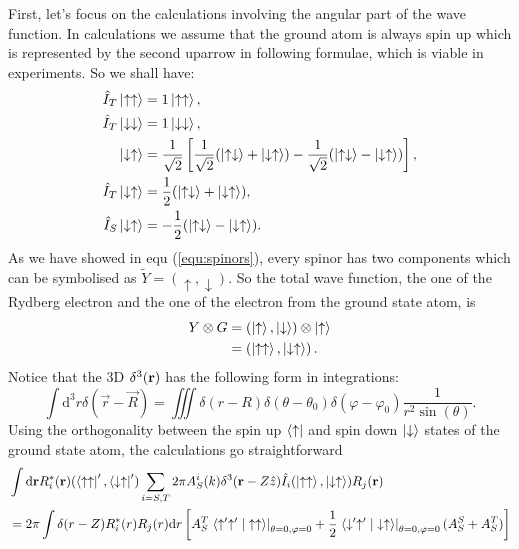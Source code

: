\documentclass[british,english]{article}
\numberwithin{equation}{section}
\numberwithin{figure}{section}
\begin{document}
First, let's focus on the calculations involving the angular part of the wave function. In calculations we assume that the ground atom is always spin up which is represented by the second uparrow in following formulae, which is viable in experiments. So we shall have:
\begin{equation}
	\begin{aligned}
	\hat I_T\ket{\uparrow\uparrow}&=1\ket{\uparrow\uparrow},\\
	\hat I_T\ket{\downarrow\downarrow}&=1\ket{\downarrow\downarrow},\\
	\ket{\downarrow\uparrow}&=\frac{1}{\sqrt{2}}\left[\frac{1}{\sqrt{2}}(\ket{\uparrow\downarrow}+\ket{\downarrow\uparrow})-\frac{1}{\sqrt{2}}(\ket{\uparrow\downarrow}-\ket{\downarrow\uparrow})\right],\\
	\hat I_T\ket{\downarrow\uparrow}&=\frac{1}{2}(\ket{\uparrow\downarrow}+\ket{\downarrow\uparrow}),\\
	\hat I_S\ket{\downarrow\uparrow}&=-\frac{1}{2}(\ket{\uparrow\downarrow}-\ket{\downarrow\uparrow}).
	\end{aligned}
\end{equation}
As we have showed in equ (\ref{equ:spinors}), every spinor has two components which can be symbolised as $\tilde Y=(\uparrow,\downarrow)$. So the total wave function, the one of the Rydberg electron and the one of the electron from the ground state atom, is
\begin{equation} 
\begin{aligned}
Y\otimes G&=(\ket{\uparrow},\ket{\downarrow})\otimes \ket{\uparrow}\\
	  &=\left(\ket{\uparrow\uparrow},\ket{\downarrow\uparrow}\right).
\end{aligned}
\end{equation}
Notice that the 3D $\delta^3({\bf r})$ has the following form in integrations:
\begin{equation}
\int \mathrm d^3 r \delta(\vec r -\vec R)=\iiint\delta(r-R)\delta(\theta-\theta_0)\delta(\varphi-\varphi_0)\frac{1}{r^2\sin(\theta)}.
\end{equation}
Using the orthogonality between the spin up $\bra{\uparrow}$ and spin down $\ket{\downarrow}$ states of the ground state atom, the calculations go straightforward
\begin{equation}
\begin{aligned}
&\int \mathrm d {\bf r}R^*_i({\bf r})(\bra{\uparrow\uparrow}',\bra{\downarrow\uparrow}')\sum_{i=S,T}2\pi A^i_S(k)\delta^3({\bf r}-Z\hat z)\hat I_i(\ket{\uparrow\uparrow},\ket{\downarrow\uparrow})R_j({\bf r})\\
&=2\pi \int \delta(r-Z) R^*_i(r)R_j(r)\mathrm d r\left[A_S^T\left.\braket{\uparrow'\uparrow'|\uparrow\uparrow}\right|_{\theta=0,\varphi=0}+\frac 12 \left.\braket{\downarrow'\uparrow'|\downarrow\uparrow}\right|_{\theta=0,\varphi=0}(A_S^S+A_S^T)\right]
\end{aligned}
\label{equ:angularS}
\end{equation}
\end{document}
